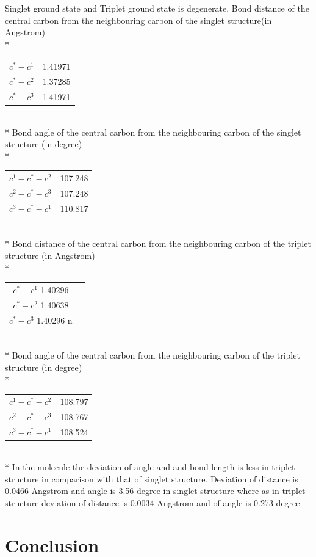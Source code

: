 \documentclass{article}
\begin{document}
Singlet ground state and Triplet ground state is degenerate.
Bond distance of the central carbon from the neighbouring carbon of the singlet structure(in Angstrom)\\*
\begin{tabular}{c c}
\(c^{*}-c^{1}\) & 1.41971 \\
\(c^{*}-c^{2}\) & 1.37285 \\
\(c^{*}-c^{3}\) & 1.41971 \\
\end{tabular}\\*
Bond angle of the central carbon from the neighbouring carbon of the singlet structure (in degree)\\*
\begin{tabular}{c c}
\(c^{1}-c^{*}-c^{2}\) & 107.248\\
\(c^{2}-c^{*}-c^{3}\) & 107.248\\
\(c^{3}-c^{*}-c^{1}\) & 110.817\\
\end{tabular}\\*
Bond distance of the central carbon from the neighbouring carbon of the triplet structure (in Angstrom)\\*
\begin{tabular}{c c}
\(c^{*}-c^{1}\) 1.40296 \\
\(c^{*}-c^{2}\) 1.40638 \\
\(c^{*}-c^{3}\) 1.40296 n\\
\end{tabular}\\*
Bond angle of the central carbon from the neighbouring carbon of the triplet structure (in degree)\\*
\begin{tabular}{c c}
\(c^{1}-c^{*}-c^{2}\) & 108.797 \\
\(c^{2}-c^{*}-c^{3}\) & 108.767 \\
\(c^{3}-c^{*}-c^{1}\) & 108.524 \\
\end{tabular}\\*
In the molecule the deviation of angle and and bond length is less in triplet structure in comparison with that of singlet structure. 
Deviation of distance is 0.0466 Angstrom and angle is 3.56 degree in singlet structure where as in triplet structure deviation of distance is 0.0034 Angstrom and of angle is 0.273 degree

\section{Conclusion}
\end{document}
